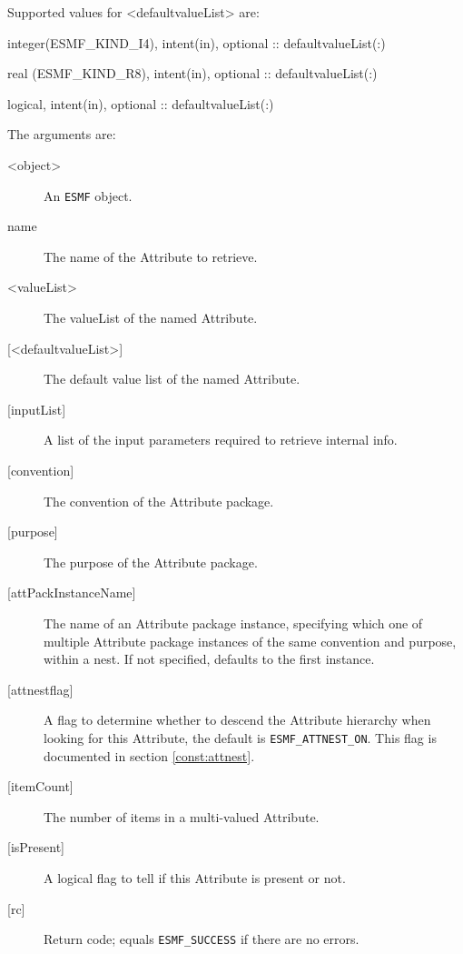    Supported values for <defaultvalueList> are:
   \begin{description}
   \item integer(ESMF\_KIND\_I4), intent(in), optional :: defaultvalueList(:)
   \item real (ESMF\_KIND\_R8), intent(in), optional :: defaultvalueList(:)
   \item logical, intent(in), optional :: defaultvalueList(:)
   \end{description}
  
   The arguments are:
   \begin{description}
   \item [<object>]
   An {\tt ESMF} object.
   \item [name]
   The name of the Attribute to retrieve.
   \item [<valueList>]
   The valueList of the named Attribute.
   \item [{[<defaultvalueList>]}]
   The default value list of the named Attribute.
   \item [{[inputList]}]
   A list of the input parameters required to retrieve internal info.
   \item [{[convention]}]
   The convention of the Attribute package.
   \item [{[purpose]}]
   The purpose of the Attribute package.
   \item [{[attPackInstanceName]}]
   The name of an Attribute package instance, specifying which one
   of multiple Attribute package instances of the same convention
   and purpose, within a nest. If not specified, defaults to the
   first instance.
   \item [{[attnestflag]}]
   A flag to determine whether to descend the
   Attribute hierarchy when looking for this Attribute, the default
   is {\tt ESMF\_ATTNEST\_ON}. This flag is documented in section
   \ref{const:attnest}.
   \item [{[itemCount]}]
   The number of items in a multi-valued Attribute.
   \item [{[isPresent]}]
   A logical flag to tell if this Attribute is present or not.
   \item [{[rc]}]
   Return code; equals {\tt ESMF\_SUCCESS} if there are no errors.
   \end{description}
  
   
 
\mbox{}\hrulefill\ 
 

